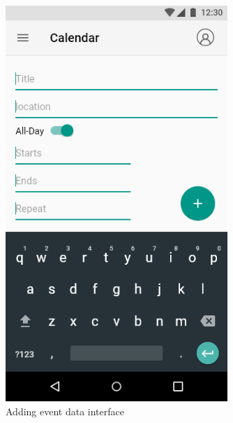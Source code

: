 \documentclass[a4paper,11pt]{article} %
\begin{document}
\begin{figure}[h!]
  \centering
  \includegraphics[width=0.75\textwidth]{img/ui-wireframe/Calendar-New-Event.png}
  \caption{Adding event data interface}
\end{figure}
\newpage
\end{document}
